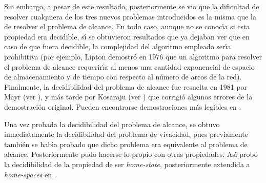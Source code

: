 Sin embargo, a pesar de este resultado, posteriormente se vio que la
dificultad de resolver cualquiera de los tres nuevos
problemas introducidos es la misma que la de resolver el
problema de alcance. En todo caso, aunque no se conoc\'{\i}a si esta
propiedad era decidible, s\'{\i} se obtuvieron
resultados que ya dejaban ver que en caso de que fuera decidible,
la complejidad del algoritmo empleado ser\'{\i}a prohibitiva
(por ejemplo, Lipton \cite{Lip76}
demostr\'{o} en 1976 que un algoritmo para resolver el problema de
alcance requerir\'{\i}a al menos una cantidad exponencial de espacio
de almacenamiento y de tiempo con respecto al n\'{u}mero de arcos de la red).
Finalmente, la decidibilidad del pro\-ble\-ma de
alcance fue resuelta en 1981 por
Mayr (ver \cite{May81}), y m\'{a}s tarde por Kosaraju (ver
\cite{Kos82}) que corrigi\'{o} algunos errores de la
demostraci\'{o}n original. Pueden encontrarse demostraciones m\'{a}s
legibles en \cite{Lam86,Reu90,Lam92}.

Una vez probada la decidibilidad del problema de
alcance, se obtuvo inme\-dia\-ta\-men\-te la decidibilidad del
problema de vivacidad, pues previamente \cite{Pet81} tambi\'{e}n se
hab\'{\i}a probado que dicho problema era equivalente al problema de alcance.
Posteriormente pudo hacerse lo propio con otras propiedades. As\'{\i}
\cite{Fru86} prob\'{o} la decidibilidad de la propiedad de ser {\it
home-state}, posteriormente extendida a {\it home-spaces} en
\cite{JoFr91}.

%

